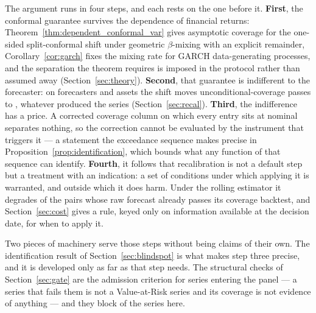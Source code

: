 \documentclass[preprint,11pt,authoryear]{elsarticle}
\newcommand{\1}{\boldsymbol{1}}
\begin{document}
The argument runs in four steps, and each rests on the one before it.
\textbf{First}, the conformal guarantee survives the dependence of financial
returns: Theorem~\ref{thm:dependent_conformal_var} gives asymptotic coverage for
the one-sided split-conformal shift under geometric $\beta$-mixing with an
explicit remainder, Corollary~\ref{cor:garch} fixes the mixing rate for GARCH
data-generating processes, and the separation the theorem requires is imposed in
the protocol rather than assumed away (Section~\ref{sec:theory}).
\textbf{Second}, that guarantee is indifferent to the forecaster: on
\nMainForecasters{} forecasters and \nMainAssets{} assets the shift moves
\nMainKupiecRawPasses{} unconditional-coverage passes to
\nMainKupiecCorPasses, whatever produced the series (Section~\ref{sec:recal}).
\textbf{Third}, the indifference has a price. A corrected coverage column on
which every entry sits at nominal separates nothing, so the correction cannot be
evaluated by the instrument that triggers it --- a statement the exceedance
sequence makes precise in Proposition~\ref{prop:identification}, which bounds
what any function of that sequence can identify.
\textbf{Fourth}, it follows that recalibration is not a default step but a
treatment with an indication: a set of conditions under which applying it is
warranted, and outside which it does harm. Under the rolling estimator it
degrades \nWellCalRollWorse{} of the \nWellCalRollN{} pairs whose raw forecast
already passes its coverage backtest, and Section~\ref{sec:cost} gives a rule,
keyed only on information available at the decision date, for when to apply it.

Two pieces of machinery serve those steps without being claims of their own. The
identification result of Section~\ref{sec:blindspot} is what makes step three
precise, and it is developed only as far as that step needs. The structural
checks of Section~\ref{sec:gate} are the admission criterion for series entering
the panel --- a series that fails them is not a Value-at-Risk series and its
coverage is not evidence of anything --- and they block \nGateBlocked{} of the
\nGateSeries{} series here.
\end{document}
